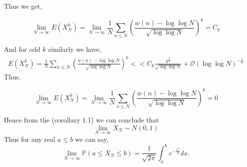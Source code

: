 \documentclass{beamer}
\numberwithin{theorem}{section}
\theoremstyle{definition}
\begin{document}
    \begin{frame}[shrink=5]
    Thus we get,
    \begin{block}{}
        $$\lim_{N\rightarrow \infty}E(X_N^k)=\lim_{N\rightarrow \infty}\frac{1}{N}\sum_{n\le N}\left(\frac{w(n)-\log\log N}{\sqrt{\log\log N} }\right)^k=C_k$$
        \end{block}
        And for odd $k$ similarly we have,
        \begin{align*}
            E(X_N^k)=\frac{1}{N}\sum_{n\le N}\left(\frac{w(n)-\log\log N}{\sqrt{\log\log N}}\right)^k<<C_k\frac{k^{\frac{3}{2}}}{\sqrt{\log\log N}}+\mathcal{O}(\log\log N)^{-\frac{1}{6}}
        \end{align*}
        Thus,
         \begin{block}{}
        $$\lim_{N\rightarrow\infty}E(X_N^k)=\lim_{N\rightarrow\infty}\frac{1}{N}\sum_{n\le N}\left(\frac{w(n)-\log\log N}{\sqrt{\log\log N}}\right)^k= 0$$
        \end{block}
       
        
    \end{frame}
    \begin{frame}{}
         Hence from the (corollary 1.1) we can conclude that 
         $$\lim_{N\rightarrow\infty}X_N\sim N(0,1)$$
         Thus for any real $a\le b$ we can say,
         $$\lim_{N\rightarrow\infty}\mathbb{P}(a\le X_N\le b)=\frac{1}{\sqrt{2\pi}}\int_{a}^{b}e^{-\frac{x^2}{2}}dx.$$
    \end{frame}
\end{document}
